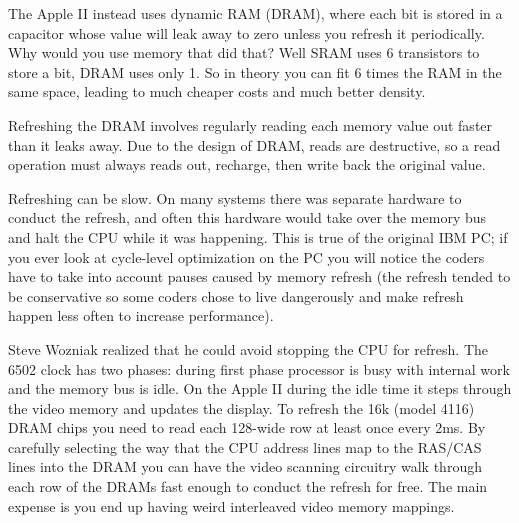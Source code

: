 \documentclass{article}
\begin{document}
The Apple II instead uses dynamic RAM (DRAM), where each bit is stored in
a capacitor whose value will leak away to zero unless you
refresh it periodically.
Why would you use memory that did that?
Well SRAM uses 6 transistors to store a bit, DRAM uses only 1.
So in theory you can fit 6 times the RAM in the same space, leading
to much cheaper costs and much better density.

Refreshing the DRAM involves regularly reading each memory value out faster
than it leaks away.
Due to the design of DRAM, reads are destructive,
so a read operation must always reads out, recharge, then write back
the original value.

Refreshing can be slow.
On many systems there was separate hardware to conduct the refresh, and
often this hardware would take over the memory bus and halt the CPU
while it was happening.
This is true of the original IBM PC;
if you ever look at cycle-level optimization on the PC
you will notice the coders have to take into account pauses caused by
memory refresh (the refresh tended to be conservative so some coders
chose to live dangerously and make refresh happen less often to increase
performance).


Steve Wozniak realized that he could avoid stopping the CPU for refresh.
The 6502 clock has two phases:
during first phase processor is busy
with internal work and the memory bus is idle.  
On the Apple II during the idle time it steps through the video memory
and updates the display.
To refresh the 16k (model 4116) DRAM chips you need to read each 128-wide
row at least once every 2ms.
By carefully selecting the way that the CPU address lines map to
the RAS/CAS lines into the DRAM you can have the video scanning
circuitry walk through each row of the DRAMs fast enough to
conduct the refresh for free. 
The main expense is you end up having weird
interleaved video memory mappings.
\end{document}
